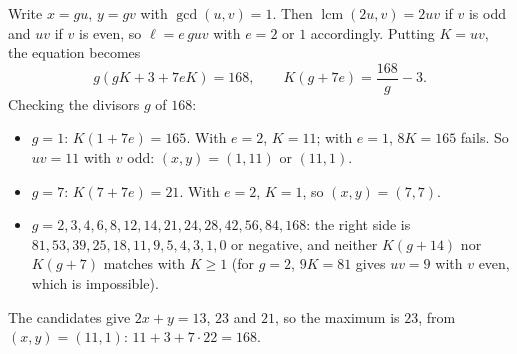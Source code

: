Write $x=gu$, $y=gv$ with $\gcd(u,v)=1$. Then $\operatorname{lcm}(2u,v)=2uv$ if $v$ is odd and $uv$ if $v$ is even, so $\ell=e\,guv$ with $e=2$ or $1$ accordingly. Putting $K=uv$, the equation becomes
\[g(gK+3+7eK)=168,\qquad K(g+7e)=\dfrac{168}g-3.\]
Checking the divisors $g$ of $168$:
\begin{itemize}
\item $g=1$: $K(1+7e)=165$. With $e=2$, $K=11$; with $e=1$, $8K=165$ fails. So $uv=11$ with $v$ odd: $(x,y)=(1,11)$ or $(11,1)$.
\item $g=7$: $K(7+7e)=21$. With $e=2$, $K=1$, so $(x,y)=(7,7)$.
\item $g=2,3,4,6,8,12,14,21,24,28,42,56,84,168$: the right side is $81,53,39,25,18,11,9,5,4,3,1,0$ or negative, and neither $K(g+14)$ nor $K(g+7)$ matches with $K\ge1$ (for $g=2$, $9K=81$ gives $uv=9$ with $v$ even, which is impossible).
\end{itemize}
The candidates give $2x+y=13$, $23$ and $21$, so the maximum is $\boxed{23}$, from $(x,y)=(11,1)$: $11+3+7\cdot22=168$.
